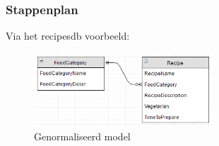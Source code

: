 \documentclass{article}
\begin{document}
\subsubsection{Stappenplan}
Via het recipesdb voorbeeld:

\begin{figure}[H]
    \centering
    \includegraphics[width=0.6\textwidth]{recipesdb.png}
    \caption{Genormaliseerd model}
\end{figure}
\end{document}
